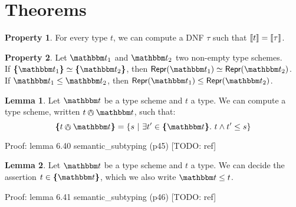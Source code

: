 \documentclass[a4paper]{article}
\theoremstyle{definition}
\newtheorem{lemma}{Lemma}
\newtheorem{property}{Property}
\begin{document}
    \section{Theorems}

    \begin{property}
      For every type $t$, we can compute a DNF $\tau$ such that ${\llbracket t \rrbracket} = {\llbracket \tau \rrbracket}$.
    \end{property}

    \begin{property}
      Let $\ts_1$ and $\ts_2$ two non-empty type schemes.\\
      If $\tsint {\ts_1} \simeq \tsint {\ts_2}$, then $\tsrep {\ts_1} \simeq \tsrep {\ts_2}$.\\
      If $\ts_1 \leq \ts_2$, then $\tsrep {\ts_1} \leq \tsrep {\ts_2}$.
    \end{property}

    \begin{lemma}
      Let $\ts$ be a type scheme and $t$ a type. We can compute a type scheme, written $t \tsand \ts$, such that:
      \[\tsint {t \tsand \ts} = \{s \alt \exists t' \in \tsint \ts.\ t \land t' \leq s \}\]
    \end{lemma}
    Proof: lemma 6.40 semantic\_subtyping (p45) [TODO: ref]


    \begin{lemma}
      Let $\ts$ be a type scheme and $t$ a type. We can decide the assertion $t \in \tsint \ts$,
      which we also write $\ts \leq t$.
    \end{lemma}
    Proof: lemma 6.41 semantic\_subtyping (p46) [TODO: ref]


\end{document}
